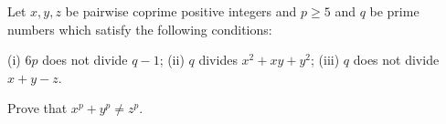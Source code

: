 Let $x,y,z$ be pairwise coprime positive integers and $p\ge5$ and $q$ be prime numbers which satisfy the following conditions:

(i) $6p$ does not divide $q-1$;
(ii) $q$ divides $x^2+xy+y^2$;
(iii) $q$ does not divide $x+y-z$.

Prove that $x^p+y^p\ne z^p$.